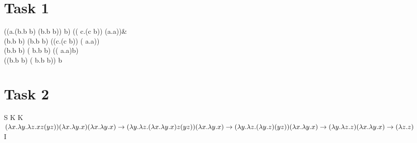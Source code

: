 \documentclass{article}
\begin{document}
\section{Task 1}

((\lambda a.(\lambda b.b b) (\lambda b.b b)) b) (( \lambda c.(c b)) (\lambda a.a))& \to\\
(\lambda b.b b) (\lambda b.b b) ((\lambda c.(c b)) ( \lambda a.a))\to\\
(\lambda b.b b) ( \lambda b.b b)  (( \lambda a.a)b) \to\\
((\lambda b.b b) ( \lambda b.b b)) b


\section{Task 2}

S K K 	\equiv\\
$(\lambda x.\lambda y.\lambda z.x z (y z)) (\lambda x.\lambda y.x) (\lambda x.\lambda y.x) \to\\
(\lambda y.\lambda z.(\lambda x.\lambda y.x) z (y z)) (\lambda x.\lambda y.x) \to\\ 
(\lambda y.\lambda z.(\lambda y.z) (y z)) (\lambda x.\lambda y.x) \to\\ 
(\lambda y.\lambda z.z) (\lambda x.\lambda y.x) \to\\
(\lambda z.z)$ \equiv\\
I
\end{document}
